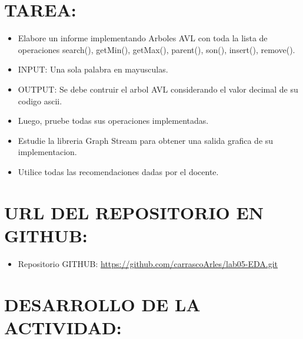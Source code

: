 \documentclass{article}
\begin{document}
	\section{TAREA:}
            \begin{itemize}
                \item Elabore un informe implementando Arboles AVL con toda la lista de operaciones  search(), getMin(), getMax(), parent(), son(), insert(), remove().
                \item INPUT: Una sola palabra en mayusculas.
                \item OUTPUT: Se debe contruir el  arbol AVL considerando el valor decimal de su codigo ascii.
                \item Luego, pruebe todas sus operaciones implementadas.
                \item Estudie la libreria Graph Stream para obtener una salida grafica de su implementacion.
                \item Utilice todas las recomendaciones dadas por el docente.
            \end{itemize}

        \section{URL DEL REPOSITORIO EN GITHUB:}
            \begin{itemize}
                \item Repositorio GITHUB: \url{https://github.com/carrascoArles/lab05-EDA.git}
            \end{itemize}
        \section{DESARROLLO DE LA ACTIVIDAD:}
\end{document}
